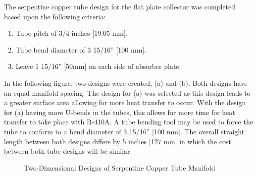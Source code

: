 \medskip
The serpentine copper tube design for the flat plate collector was completed based upon the following criteria:

\medskip
\begin{enumerate}[itemsep=3mm, parsep=-1mm, label=\roman*.]
    \item Tube pitch of 3/4 inches [19.05 mm].
    \item Tube bend diameter of 3 15/16” [100 mm].
    \item Leave 1 15/16” [50mm] on each side of absorber plate.
\end{enumerate}

\medskip
In the following figure, two designs were created, (a) and (b). Both designs have an equal manifold spacing. The design for (a) was selected as this design leads to a greater surface area allowing for more heat transfer to occur. With the design for (a) having more U-bends in the tubes, this allows for more time for heat transfer to take place with R-410A. A tube bending tool may be used to force the tube to conform to a bend diameter of 3 15/16” [100 mm]. The overall straight length between both designs differs by 5 inches [127 mm] in which the cost between both tube designs will be similar.

\newpage
\begin{figure}[ht]
    \centering
    \qquad
    \caption{Two-Dimensional Designs of Serpentine Copper Tube Manifold}
\end{figure}

